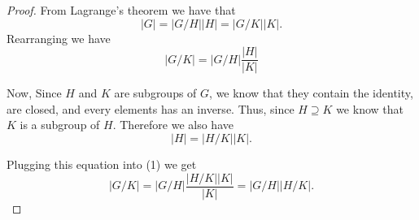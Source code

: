\documentclass{article}
\begin{document}
\begin{proof}
    From Lagrange's theorem we have that
    \begin{equation*}
        |G| = |G / H||H| = |G / K||K|.
    \end{equation*}
    Rearranging we have
    \begin{equation}
        |G / K| = |G / H| \frac{|H|}{|K|}
    \end{equation}

    Now, Since $H$ and $K$ are subgroups of $G$, we know that they contain the
    identity, are closed, and every elements has an inverse. Thus, since
    $H \supseteq K$ we know that $K$ is a subgroup of $H$. Therefore we also have
    \begin{equation*}
        |H| = |H / K||K|.
    \end{equation*}

    Plugging this equation into (1) we get
    \begin{equation*}
        |G / K| = |G / H| \frac{|H / K||K|}{|K|} = |G / H||H/K|.
    \end{equation*}
\end{proof}
\end{document}
